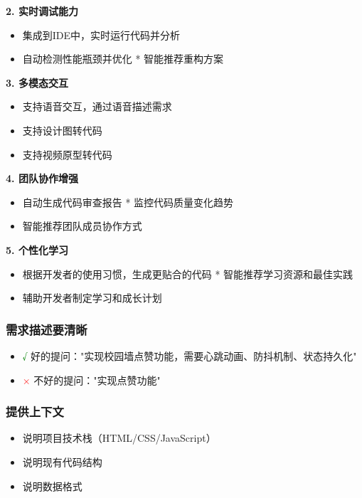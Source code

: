 ﻿\documentclass[12pt,a4paper]{article}
\begin{document}
\textbf{2. 实时调试能力}
\begin{itemize}
    \item 集成到IDE中，实时运行代码并分析
    \item 自动检测性能瓶颈并优化
    * 智能推荐重构方案
\end{itemize}

\textbf{3. 多模态交互}
\begin{itemize}
    \item 支持语音交互，通过语音描述需求
    \item 支持设计图转代码
    \item 支持视频原型转代码
\end{itemize}

\textbf{4. 团队协作增强}
\begin{itemize}
    \item 自动生成代码审查报告
    * 监控代码质量变化趋势
    \item 智能推荐团队成员协作方式
\end{itemize}

\textbf{5. 个性化学习}
\begin{itemize}
    \item 根据开发者的使用习惯，生成更贴合的代码
    * 智能推荐学习资源和最佳实践
    \item 辅助开发者制定学习和成长计划
\end{itemize}

\subsubsection{需求描述要清晰}
\begin{itemize}
    \item \textcolor{green}{√} 好的提问："实现校园墙点赞功能，需要心跳动画、防抖机制、状态持久化"
    \item \textcolor{red}{×} 不好的提问："实现点赞功能"
\end{itemize}

\subsubsection{提供上下文}
\begin{itemize}
    \item 说明项目技术栈（HTML/CSS/JavaScript）
    \item 说明现有代码结构
    \item 说明数据格式
\end{itemize}
\end{document}
